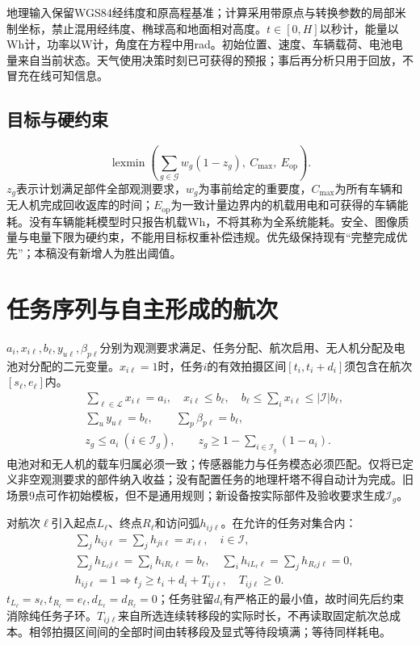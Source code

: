 \noindent 地理输入保留WGS84经纬度和原高程基准；计算采用带原点与转换参数的局部米制坐标，禁止混用经纬度、椭球高和地面相对高度。$t\in[0,H]$以秒计，能量以Wh计，功率以W计，角度在方程中用rad。初始位置、速度、车辆载荷、电池电量来自当前状态。天气使用决策时刻已可获得的预报；事后再分析只用于回放，不冒充在线可知信息。

\subsection{目标与硬约束}
\begin{equation}
 \operatorname{lexmin}\left(\sum_{g\in\mathcal G}w_g(1-z_g),\ C_{\max},\ E_{\mathrm{op}}\right).
 \label{eng:eq:objective}
\end{equation}
\noindent $z_g$表示计划满足部件全部观测要求，$w_g$为事前给定的重要度，$C_{\max}$为所有车辆和无人机完成回收返库的时间；$E_{\mathrm{op}}$为一致计量边界内的机载用电和可获得的车辆能耗。没有车辆能耗模型时只报告机载Wh，不将其称为全系统能耗。安全、图像质量与电量下限为硬约束，不能用目标权重补偿违规。优先级保持现有“完整完成优先”；本稿没有新增人为胜出阈值。
\clearpage

\section{任务序列与自主形成的航次}
\noindent $a_i,x_{i\ell},b_\ell,y_{u\ell},\beta_{p\ell}$分别为观测要求满足、任务分配、航次启用、无人机分配及电池对分配的二元变量。$x_{i\ell}=1$时，任务$i$的有效拍摄区间$[t_i,t_i+d_i]$须包含在航次$[s_\ell,e_\ell]$内。
\begin{align}
 &\sum_{\ell\in\mathcal L}x_{i\ell}=a_i,\quad x_{i\ell}\le b_\ell,\quad
 b_\ell\le\sum_i x_{i\ell}\le |\mathcal I|b_\ell,\label{eng:eq:assign}\\
 &\sum_u y_{u\ell}=b_\ell,\qquad \sum_p\beta_{p\ell}=b_\ell,\label{eng:eq:fleet}\\
 &z_g\le a_i\ (i\in\mathcal I_g),\qquad
 z_g\ge1-\sum_{i\in\mathcal I_g}(1-a_i).\label{eng:eq:complete}
\end{align}
\noindent 电池对和无人机的载车归属必须一致；传感器能力与任务模态必须匹配。仅将已定义非空观测要求的部件纳入收益；没有配置任务的地理杆塔不得自动计为完成。旧场景9点可作初始模板，但不是通用规则；新设备按实际部件及验收要求生成$\mathcal I_g$。

\noindent 对航次$\ell$引入起点$L_\ell$、终点$R_\ell$和访问弧$h_{ij\ell}$。在允许的任务对集合内：
\begin{align}
 &\sum_j h_{ij\ell}=\sum_jh_{ji\ell}=x_{i\ell},\quad i\in\mathcal I,\\
 &\sum_jh_{L_\ell j\ell}=\sum_i h_{iR_\ell\ell}=b_\ell,
 \quad \sum_i h_{iL_\ell\ell}=\sum_jh_{R_\ell j\ell}=0,\\
 &h_{ij\ell}=1\Rightarrow t_j\ge t_i+d_i+T_{ij\ell},\quad
 T_{ij\ell}\ge0.\label{eng:eq:sequence}
\end{align}
\noindent $t_{L_\ell}=s_\ell,t_{R_\ell}=e_\ell,d_{L_\ell}=d_{R_\ell}=0$；任务驻留$d_i$有严格正的最小值，故时间先后约束消除纯任务子环。$T_{ij\ell}$来自所选连续转移段的实际时长，不再读取固定航次总成本。相邻拍摄区间间的全部时间由转移段及显式等待段填满；等待同样耗电。

